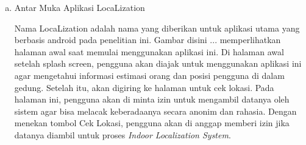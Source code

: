 \begin{enumerate}[a.]
	\item Antar Muka Aplikasi LocaLization

	      \par Nama LocaLization adalah nama yang diberikan untuk aplikasi utama yang berbasis android pada penelitian ini. Gambar disini ... memperlihatkan halaman awal saat memulai menggunakan aplikasi ini. Di halaman awal setelah splash screen, pengguna akan diajak untuk menggunakan aplikasi ini agar mengetahui informasi estimasi orang dan posisi pengguna di dalam gedung. Setelah itu, akan digiring ke halaman untuk cek lokasi. Pada halaman ini, pengguna akan di minta izin untuk mengambil datanya oleh sistem agar bisa melacak keberadaanya secara anonim dan rahasia. Dengan menekan tombol Cek Lokasi, pengguna akan di anggap memberi izin jika datanya diambil untuk proses \textit{Indoor Localization System}.




\end{enumerate}
